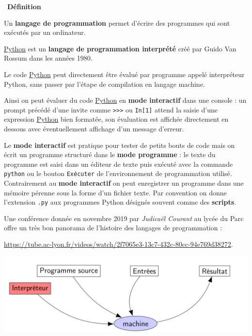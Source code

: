 \documentclass[a4paper, french, 12pt]{article}  %
\newcounter{def}
\newenvironment{definition}[1]
{\par \medskip   \addtocounter{def}{1} \noindent  
\begin{bclogo}[arrondi =0.1,  ombre = true, barre=none, logo=\bcbook, marge=4]{~\textbf{Définition} \textbf{\thedef} {\itshape #1} }  \par}
{
\end{bclogo}
 \par \bigskip }
\newcounter{prog}
\newcounter{histo}
\begin{document}
\begin{definition}{}
Un \textbf{langage de programmation} permet d'écrire des programmes qui sont exécutés par un ordinateur.

\href{https://fr.wikipedia.org/wiki/Python_(langage)}{Python} est un \textbf{langage de programmation interprété} créé par Guido Van Rossum dans les années 1980.


Le code \href{https://fr.wikipedia.org/wiki/Python_(langage)}{Python} peut directement être évalué par programme appelé interpréteur Python, sans passer par l'étape de compilation en langage machine. 

Ainsi on peut évaluer du code \href{https://fr.wikipedia.org/wiki/Python_(langage)}{Python} en \textbf{mode interactif} dans une console : un prompt  précédé d'une invite comme \texttt{>>>} ou \texttt{In[1]} attend la saisie d'une expression \href{https://fr.wikipedia.org/wiki/Python_(langage)}{Python} bien formatée, son évaluation est affichée directement en dessous avec éventuellement affichage d'un message d'erreur.

Le \textbf{mode interactif} est pratique pour tester de petits bouts de code mais on écrit un programme structuré dans le \textbf{mode programme} : le texte du programme est saisi dans un éditeur de texte puis exécuté avec la commande \texttt{python} ou le bouton \texttt{Exécuter} de l'environnement de programmation utilisé. Contrairement au  \textbf{mode interactif} on peut enregistrer un programme dans une mémoire pérenne sous la forme d'un fichier texte. Par convention on donne l'extension \texttt{.py} aux programmes Python désignés souvent comme des  \textbf{scripts}.

Une conférence donnée en novembre 2019 par \textit{Judicaël Courant} au lycée du Parc offre un très bon panorama de l'histoire des langages de programmation :

\url{https://tube.ac-lyon.fr/videos/watch/2f7065e3-13c7-432c-80cc-94e769d38272}.

\begin{center}
\includegraphics[scale=0.25]{ressources/interpreteur.png}


\end{center}
\end{definition}
\end{document}
